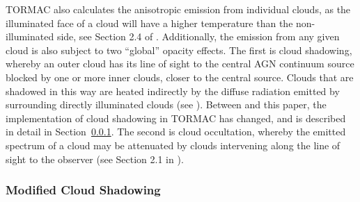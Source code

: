 
\par TORMAC also calculates the anisotropic emission from individual clouds, as the illuminated face of a cloud will have a higher temperature than the non-illuminated side, see Section 2.4 of \cite{almeyda_modeling_2017}. Additionally, the emission from any given cloud is also subject to two “global” opacity effects. The first is cloud shadowing, whereby an outer cloud has its line of sight to the central AGN continuum source blocked by one or more inner clouds, closer to the central source. Clouds that are shadowed in this way are heated indirectly by the diffuse radiation emitted by surrounding directly illuminated clouds (see \cite{almeyda_modeling_2017}). Between \cite{almeyda_modeling_2020} and this paper, the implementation of cloud shadowing in TORMAC has changed, and is described in detail in Section~\ref{sec:cloudcounting}. The second is cloud occultation, whereby the emitted spectrum of a cloud may be attenuated by clouds intervening along the line of sight to the observer (see Section 2.1 in \cite{almeyda_modeling_2020}). 

\subsubsection{Modified Cloud Shadowing}  \label{sec:cloudcounting}

